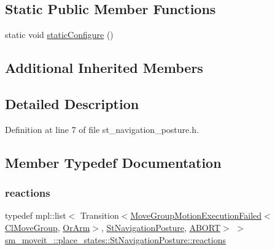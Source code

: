 \subsection*{Static Public Member Functions}
\begin{DoxyCompactItemize}
\item 
static void \hyperlink{structsm__moveit__4_1_1place__states_1_1StNavigationPosture_a29ac0c6cd858bb59ca3bc103da13b0a0}{static\+Configure} ()
\end{DoxyCompactItemize}
\subsection*{Additional Inherited Members}


\subsection{Detailed Description}


Definition at line 7 of file st\+\_\+navigation\+\_\+posture.\+h.



\subsection{Member Typedef Documentation}
\mbox{\label{structsm__moveit__4_1_1place__states_1_1StNavigationPosture_a2588352d77d56f7a1f3df49fe37629d4}} 
\subsubsection{\texorpdfstring{reactions}{reactions}}
{\footnotesize\ttfamily typedef mpl\+::list$<$ Transition$<$\hyperlink{structmoveit__z__client_1_1MoveGroupMotionExecutionFailed}{Move\+Group\+Motion\+Execution\+Failed}$<$\hyperlink{classmoveit__z__client_1_1ClMoveGroup}{Cl\+Move\+Group}, \hyperlink{classsm__moveit__4_1_1OrArm}{Or\+Arm}$>$, \hyperlink{structsm__moveit__4_1_1place__states_1_1StNavigationPosture}{St\+Navigation\+Posture}, \hyperlink{classABORT}{A\+B\+O\+RT}$>$ $>$ \hyperlink{structsm__moveit__4_1_1place__states_1_1StNavigationPosture_a2588352d77d56f7a1f3df49fe37629d4}{sm\+\_\+moveit\+\_\+::place\+\_\+states\+::\+St\+Navigation\+Posture\+::reactions}}



